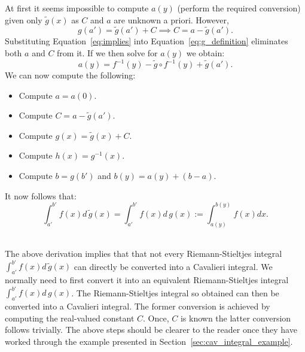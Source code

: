 \documentclass[twoside,reqno,11pt]{fcaa-var} %
\begin{document}
\noindent
At first it seems impossible to compute $a(y)$ (perform the required conversion) given only $\widetilde{g}(x)$ as $C$ and $a$ are unknown a priori. However, 
\begin{equation}
\label{eq:implies}
g(a') = \widetilde{g}(a') + C \implies C = a - \widetilde{g}(a'). 
\end{equation}
Substituting Equation~\eqref{eq:implies} into Equation~\eqref{eq:g_definition} eliminates both $a$ and $C$ from it. If we then solve for $a(y)$ we obtain:
\begin{equation}
a(y) = f^{-1}(y)-\widetilde{g}\circ f^{-1}(y) + \widetilde{g}(a'). 
\end{equation}
We can now compute the following:
\begin{itemize}
\item Compute $a = a(0)$.
\item Compute $C = a - \widetilde{g}(a')$.
\item Compute $g(x) = \widetilde{g}(x) + C$.
\item Compute $h(x) = g^{-1}(x)$.
\item Compute $b = g(b')$ and $b(y) = a(y) + (b-a)$.
\end{itemize}
It now follows that: 
\begin{equation}
\int_{a'}^{b'} f(x)d\,\widetilde{g}(x) = \int_{a'}^{b'} f(x)d\,g(x):=\int_{a(y)}^{b(y)}f(x)dx. 
\end{equation}\

\noindent
The above derivation implies that that not every Riemann-Stieltjes integral $\int_{a'}^{b'} f(x) d\,\widetilde{g}(x)$ can directly be converted into a Cavalieri integral. We normally need to first convert it into an equivalent Riemann-Stieltjes integral $\int_{a'}^{b'} f(x) d\,g(x)$. The Riemann-Stieltjes integral so obtained can then be converted into a Cavalieri integral. The former conversion is achieved by computing the real-valued constant $C$. Once, $C$ is known the latter conversion follows trivially. The above steps should be clearer to the reader once they have worked through the example presented in Section~\ref{sec:cav_integral_example}.\\

\end{document}
